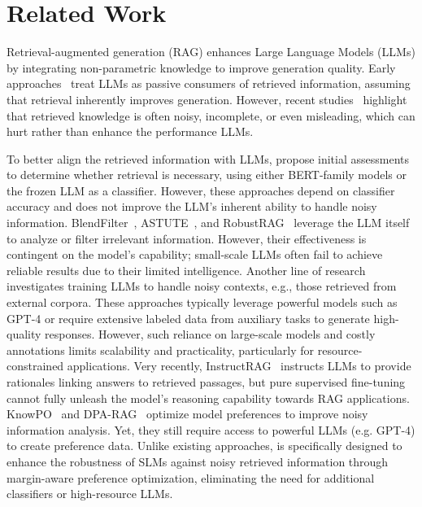\section{Related Work}
Retrieval-augmented generation (RAG) enhances Large Language Models (LLMs) by integrating non-parametric knowledge to improve generation quality. 
Early approaches~\cite {izacard2022atlas, shi2023replug} treat LLMs as passive consumers of retrieved information, assuming that retrieval inherently improves generation. However, recent studies~\citep{wang2023self, li2023llatrieval, yu2024rankrag} highlight that retrieved knowledge is often noisy, incomplete, or even misleading, which can hurt rather than enhance the performance LLMs. 


To better align the retrieved information with LLMs, \citet{wang2023self,jeong2024adaptive} propose initial assessments to determine whether retrieval is necessary, using either BERT-family models or the frozen LLM as a classifier. However, these approaches depend on classifier accuracy and does not improve the LLM’s inherent ability to handle noisy information. BlendFilter~\citep{wang2024blendfilter}, ASTUTE~\citep{wang2024astute}, and RobustRAG~\citep{xiang2024certifiably} leverage the LLM itself to analyze or filter irrelevant information. However, their effectiveness is contingent on the model’s capability; small-scale LLMs often fail to achieve reliable results due to their limited intelligence. 
Another line of research~\citep{fang2024enhancing, yoranmaking, yu2023chain, yu2024rankrag} investigates training LLMs to handle noisy contexts, e.g., those retrieved from external corpora. These approaches typically leverage powerful models such as GPT-4 or require extensive labeled data from auxiliary tasks to generate high-quality responses. However, such reliance on large-scale models and costly annotations limits scalability and practicality, particularly for resource-constrained applications. 
Very recently, 
InstructRAG~\citep{wei2024instructrag} instructs LLMs to provide rationales linking answers to retrieved passages, but pure supervised fine-tuning cannot fully unleash the model's reasoning capability towards RAG applications.  
KnowPO~\citep{zhang2024knowpo} and DPA-RAG~\citep{dong2024understand} optimize model preferences to improve noisy information analysis. Yet, they still require access to powerful LLMs (e.g. GPT-4) to create preference data. 
Unlike existing approaches, {\name} is specifically designed to enhance the robustness of SLMs against noisy retrieved information through margin-aware preference optimization, eliminating the need for additional classifiers or high-resource LLMs.